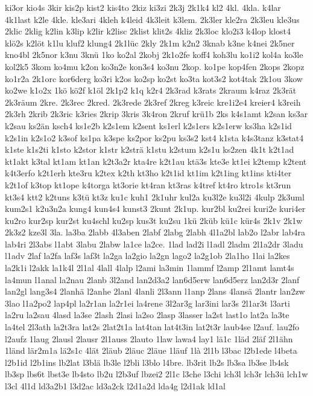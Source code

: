 {ki3or
kio4s
3kir
kis2p
kist2
kis4to
2kiz
ki3zi
2k3j
2k1k4
kl2
4kl.
4kla.
k4lar
4k1last
k2le
4kle.
kle3ari
4kleh
k4leid
4k3leit
k3lem.
2k3ler
kle2ra
2k3leu
kle3us
2klic
2klig
k2lin
k3lip
k2lir
k2lisc
2klist
klit2s
4kliz
2k3loc
klo2i3
k4lop
klost4
klö2s
k2löt
k1lu
kluf2
klung4
2k1lüc
2kly
2k1m
k2n2
3knab
k3ne
k4nei
2k5ner
kno4bl
2k5nor
k3nu
3knü
1ko
ko2al
2kobj
2k1o2fe
koff4
koh3lu
ko1i2
kol4a
ko3le
kol2k5
3kom
ko4mu
k2on
ko3n2e
kon3s4
ko3nu
2kop.
ko1pe
kop4fen
2kops
2kopz
ko1r2a
2k1orc
kor6derg
ko3ri
k2os
ko2sp
ko2st
ko3ta
kot3s2
kot4tak
2k1ou
3kow
ko2we
k1o2x
1kö
kö2f
k1öl
2k1p2
k1q
k2r4
2k3rad
k3rats
2kraum
k4raz
2k3rät
2k3räum
2kre.
2k3rec
2kred.
2k3rede
2k3ref
2kreg
k3reic
kre1i2e4
kreier4
k3reih
2k3rh
2krib
2k3ric
k3ries
2krip
3kris
3k4ron
2kruf
krü1b
2ks
k4s1amt
k2san
ks3ar
k2sau
ks2än
ksch4
ks1e2b
k2s1em
k2sent
ks1erl
k2s1ers
k2s1erw
ks3ha
k2s1id
k2s1in
k2s1o2
k3sof
ks1pa
k3spe
ks2por
ks2pu
ks3s2
kst4
k1sta
k4s3tanz
k3stat4
k1ste
k1s2ti
k1sto
k2stor
k1str
k2strä
k1stu
k2stum
k2s1u
ks2zen
4k1t
k2t1ad
kt1akt
k3tal
kt1am
kt1an
k2t3a2r
kta4re
k2t1au
ktä3s
kte3e
kt1ei
k2temp
k2tent
k4t3erfo
k2t1erh
kte3ru
k2tex
k2th
kt3ho
k2t1id
kt1im
k2t1ing
kt1ins
kti4ter
k2t1of
k3top
kt1ope
k4torga
kt3orie
kt4ran
kt3ras
k4tref
kt4ro
ktro1s
kt3run
kt3s4
ktt2
k2tuns
k3tü
kt3z
ku1c
kuh1
2k1uhr
kul2a
ku3l2e
ku3l2i
4kulp
2k3uml
kum2s1
k2u3n2a
kung4
kun4s4
kunst3
2kunt
2k1up.
kur2bl
ku2rei
kuri2e
kuri4er
ku2ro
kur2sp
kur2st
ku4schl
ku2sp
kus3t
ku2su
1kü
2küb
kü1c
kür4s
2k1v
2k1w
2k3z2
kze3l
3la.
la3ba
2labb
4l3aben
2labf
2labg
2labh
4l1a2bl
lab2o
l2abr
lab4ra
lab4ri
2l3abs
l1abt
3labu
2labw
la1ce
la2ce.
1lad
lad2i
l1adl
2ladm
2l1a2dr
3ladu
l1adv
2laf
la2fa
laf3s
laf3t
la2ga
la2gio
la2gn
lago2
la2g1ob
2la1ho
1lai
la2kes
la2k1i
l2akk
la1k4l
2l1al
4lall
4lalp
l2ami
la3min
1lammf
l2amp
2l1amt
lamt4s
la4mun
l1anal
la2nau
2lanb
3l2and
lan2d3a2
lan6d5erw
lan6d5erz
lan2d3r
2lanf
lan2gl
lang3s4
2lanhä
l2anhe
2lanl
4lanli
2l3ann
l1anp
2lans
4lansä
2lantr
lan2zw
3lao
l1a2po2
lap4pl
la2r1an
la2r1ei
la4rene
3l2ar3g
lar3ini
lar3s
2l1ar3t
l3arti
la2ru
la2sau
4lasd
la3se
2lash
2lasi
la2so
2lasp
3lasser
la2st
last1o
lat2a
la3te
la4tel
2l3ath
la2t3ra
lat2s
2lat2t1a
lat4tan
lat4t3in
lat2t3r
laub4se
l2auf.
lau2fo
l2aufz
1laug
2lausl
2lausr
2l1auss
2lauto
1law
lawa4
lay1
lä1c
1läd
2läf
2l1ähn
1länd
lär2m1a
lä2s1c
4lät
2läub
2läuc
2läue
1läuf
1là
2l1b
l3bac
l2b1ede
l4beta
l2b1id
l2b1ins
lb2lat
l3blä
lb3le
l2bli
l3blo
l4bre.
lb3rit
lb2s
lb3sa
lb3se
lb4sk
lb3sp
lbs6t
lbst3e
lb4sto
lb2u
l2b3uf
lbzei2
2l1c
l3che
l3chi
lch3l
lch3r
lch3ü
lch1w
l3cl
4l1d
ld3a2b1
l3d2ac
ld3a2ck
l2d1a2d
lda4g
l2d1ak
ld1al
}
